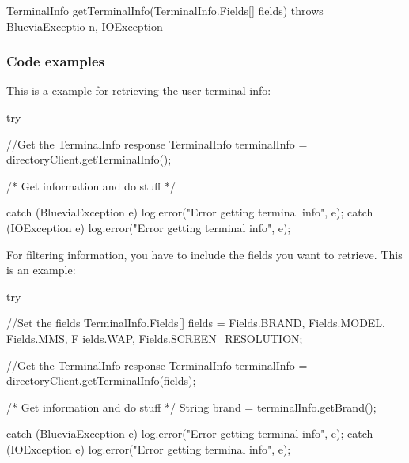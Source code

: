 \begin{DoxyCode}
TerminalInfo getTerminalInfo(TerminalInfo.Fields[] fields) throws BlueviaExceptio
      n, IOException
\end{DoxyCode}
\hypertarget{blv_directory_guide_user_terminal_info_code_examples_sec}{}\subsubsection{Code examples}\label{blv_directory_guide_user_terminal_info_code_examples_sec}
This is a example for retrieving the user terminal info:


\begin{DoxyCode}
try {
        //Get the TerminalInfo response
        TerminalInfo terminalInfo = directoryClient.getTerminalInfo();

        /* Get information and do stuff */
          
} catch (BlueviaException e) {
        log.error("Error getting terminal info", e);
} catch (IOException e) {
        log.error("Error getting terminal info", e);
}
\end{DoxyCode}


For filtering information, you have to include the fields you want to retrieve. This is an example:


\begin{DoxyCode}
try {
        //Set the fields
        TerminalInfo.Fields[] fields = {Fields.BRAND, Fields.MODEL, Fields.MMS, F
      ields.WAP, Fields.SCREEN_RESOLUTION};
        
        //Get the TerminalInfo response
        TerminalInfo terminalInfo = directoryClient.getTerminalInfo(fields);

        /* Get information and do stuff */
        String brand = terminalInfo.getBrand();
          
} catch (BlueviaException e) {
        log.error("Error getting terminal info", e);
} catch (IOException e) {
        log.error("Error getting terminal info", e);
}
\end{DoxyCode}
 